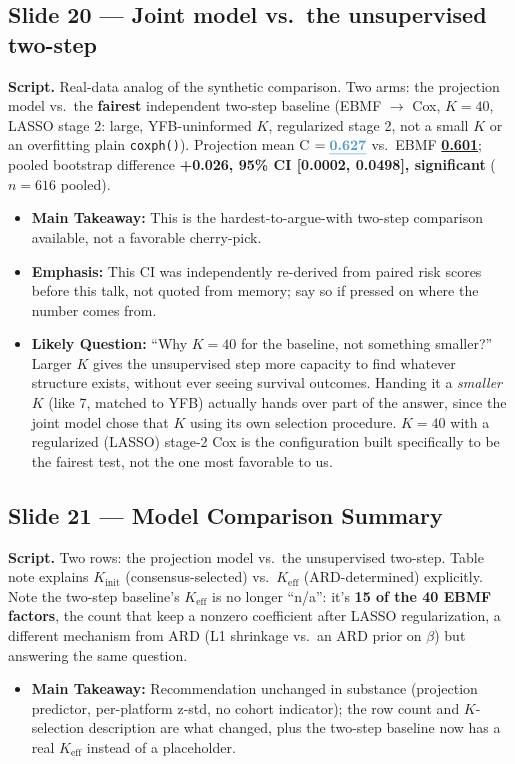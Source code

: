 \documentclass[11pt]{article}
\newcommand{\scriptlabel}{\textbf{Script. }}
\newcommand{\sectionlabel}[1]{\textbf{#1}}
\newcommand{\key}[1]{\textcolor{keyblue}{\textbf{#1}}}        %
\newcommand{\num}[1]{\textcolor{keycar}{\textbf{\uline{#1}}}} %
\begin{document}
\subsection*{Slide 20 --- Joint model vs.\ the unsupervised two-step}
\scriptlabel Real-data analog of the synthetic comparison. Two arms: the projection model vs.\ the
\key{fairest} independent two-step baseline (EBMF $\to$ Cox, $K=40$, LASSO stage 2: large,
YFB-uninformed $K$, regularized stage 2, not a small $K$ or an overfitting plain \texttt{coxph()}).
Projection mean C $=\num{0.627}$ vs.\ EBMF \num{0.601}; pooled bootstrap difference \key{+0.026, 95\%
CI [0.0002, 0.0498], significant} ($n=616$ pooled).

\begin{itemize}
\item \sectionlabel{Main Takeaway:} This is the hardest-to-argue-with two-step comparison available,
not a favorable cherry-pick.
\item \sectionlabel{Emphasis:} This CI was independently re-derived from paired risk scores before
this talk, not quoted from memory; say so if pressed on where the number comes from.
\item \sectionlabel{Likely Question:} ``Why $K=40$ for the baseline, not something smaller?'' Larger
$K$ gives the unsupervised step more capacity to find whatever structure exists, without ever seeing
survival outcomes. Handing it a \emph{smaller} $K$ (like 7, matched to YFB) actually hands over part
of the answer, since the joint model chose that $K$ using its own selection procedure. $K=40$ with a
regularized (LASSO) stage-2 Cox is the configuration built specifically to be the fairest test, not
the one most favorable to us.
\end{itemize}

\subsection*{Slide 21 --- Model Comparison Summary}
\scriptlabel Two rows: the projection model vs.\ the unsupervised two-step. Table note explains
$K_\text{init}$ (consensus-selected) vs.\ $K_\text{eff}$ (ARD-determined) explicitly. Note the
two-step baseline's $K_\text{eff}$ is no longer ``n/a'': it's \key{15 of the 40 EBMF factors},
the count that keep a nonzero coefficient after LASSO regularization, a different mechanism from ARD
(L1 shrinkage vs.\ an ARD prior on $\beta$) but answering the same question.

\begin{itemize}
\item \sectionlabel{Main Takeaway:} Recommendation unchanged in substance (projection predictor,
per-platform z-std, no cohort indicator); the row count and $K$-selection description are what
changed, plus the two-step baseline now has a real $K_\text{eff}$ instead of a placeholder.
\end{itemize}
\end{document}
